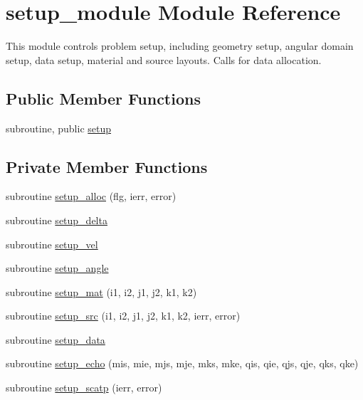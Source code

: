 \hypertarget{classsetup__module}{\section{setup\-\_\-module Module Reference}
\label{classsetup__module}
}


This module controls problem setup, including geometry setup, angular domain setup, data setup, material and source layouts. Calls for data allocation.  


\subsection*{Public Member Functions}
\begin{DoxyCompactItemize}
\item 
subroutine, public \hyperlink{classsetup__module_a302c0c32f6276d487ccd246981c5a4f6}{setup}
\end{DoxyCompactItemize}
\subsection*{Private Member Functions}
\begin{DoxyCompactItemize}
\item 
subroutine \hyperlink{classsetup__module_a7fa1b271cf77ca1416f6421a57fb3533}{setup\-\_\-alloc} (flg, ierr, error)
\item 
subroutine \hyperlink{classsetup__module_a056c9f3cb41e4205ef97af53f6eb1a43}{setup\-\_\-delta}
\item 
subroutine \hyperlink{classsetup__module_a1ca835a5c592e2d2084252cc3fb7c19b}{setup\-\_\-vel}
\item 
subroutine \hyperlink{classsetup__module_a272a99aaea9895d7d7baee2985cfaed2}{setup\-\_\-angle}
\item 
subroutine \hyperlink{classsetup__module_acf400f64b6ae6d7e3914101ce752632c}{setup\-\_\-mat} (i1, i2, j1, j2, k1, k2)
\item 
subroutine \hyperlink{classsetup__module_ab719a152a3290e747a78d8cd7a0bd9f4}{setup\-\_\-src} (i1, i2, j1, j2, k1, k2, ierr, error)
\item 
subroutine \hyperlink{classsetup__module_a1780e88c878f925e9165c350b636957b}{setup\-\_\-data}
\item 
subroutine \hyperlink{classsetup__module_a4e4f5096991d7611f949f66b0a70268d}{setup\-\_\-echo} (mis, mie, mjs, mje, mks, mke, qis, qie, qjs, qje, qks, qke)
\item 
subroutine \hyperlink{classsetup__module_a33ddf34647e1aa158c6d3a1e96fbd3f6}{setup\-\_\-scatp} (ierr, error)
\end{DoxyCompactItemize}


